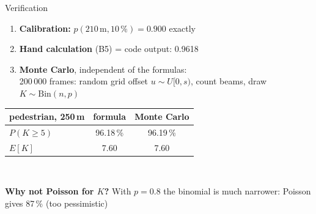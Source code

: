 \documentclass[aspectratio=169,11pt]{beamer}
\begin{document}
\begin{frame}{Verification}
  \small
  \begin{enumerate}
    \item \textbf{Calibration:} $p(210\,\text{m}, 10\,\%) = 0.900$ exactly
    \item \textbf{Hand calculation} (B5) = code output: 0.9618
    \item \textbf{Monte Carlo}, independent of the formulas:\\
      200\,000 frames: random grid offset $u \sim U[0,s)$, count beams, draw $K \sim \mathrm{Bin}(n,p)$
  \end{enumerate}
  \vspace{0.5em}
  \centering
  \begin{tabular}{lcc}
    \toprule
    pedestrian, 250\,m & formula & Monte Carlo \\
    \midrule
    $P(K \ge 5)$ & 96.18\,\% & 96.19\,\% \\
    $E[K]$ & 7.60 & 7.60 \\
    \bottomrule
  \end{tabular}\\[1em]
  \raggedright
  \textbf{Why not Poisson for $K$?} With $p = 0.8$ the binomial is much narrower:
  Poisson gives 87\,\% (too pessimistic)
\end{frame}
\end{document}
